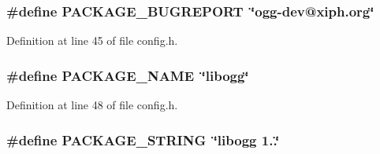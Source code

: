 \subsubsection[{\texorpdfstring{P\+A\+C\+K\+A\+G\+E\+\_\+\+B\+U\+G\+R\+E\+P\+O\+RT}{PACKAGE_BUGREPORT}}]{\setlength{\rightskip}{0pt plus 5cm}\#define P\+A\+C\+K\+A\+G\+E\+\_\+\+B\+U\+G\+R\+E\+P\+O\+RT~\char`\"{}ogg-\/dev@xiph.\+org\char`\"{}}\hypertarget{mac_2config_2i386_2lib-src_2libogg_2config_8h_a1d1d2d7f8d2f95b376954d649ab03233}{}\label{mac_2config_2i386_2lib-src_2libogg_2config_8h_a1d1d2d7f8d2f95b376954d649ab03233}


Definition at line 45 of file config.\+h.

\subsubsection[{\texorpdfstring{P\+A\+C\+K\+A\+G\+E\+\_\+\+N\+A\+ME}{PACKAGE_NAME}}]{\setlength{\rightskip}{0pt plus 5cm}\#define P\+A\+C\+K\+A\+G\+E\+\_\+\+N\+A\+ME~\char`\"{}libogg\char`\"{}}\hypertarget{mac_2config_2i386_2lib-src_2libogg_2config_8h_a1c0439e4355794c09b64274849eb0279}{}\label{mac_2config_2i386_2lib-src_2libogg_2config_8h_a1c0439e4355794c09b64274849eb0279}


Definition at line 48 of file config.\+h.

\subsubsection[{\texorpdfstring{P\+A\+C\+K\+A\+G\+E\+\_\+\+S\+T\+R\+I\+NG}{PACKAGE_STRING}}]{\setlength{\rightskip}{0pt plus 5cm}\#define P\+A\+C\+K\+A\+G\+E\+\_\+\+S\+T\+R\+I\+NG~\char`\"{}libogg 1..\char`\"{}}\hypertarget{mac_2config_2i386_2lib-src_2libogg_2config_8h_ac73e6f903c16eca7710f92e36e1c6fbf}{}\label{mac_2config_2i386_2lib-src_2libogg_2config_8h_ac73e6f903c16eca7710f92e36e1c6fbf}


